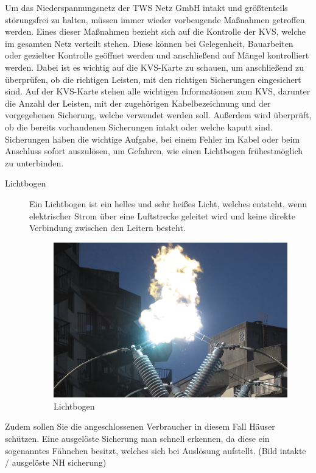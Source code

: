 Um das Niederspannungsnetz der TWS Netz GmbH intakt und größtenteils störungsfrei zu halten, müssen immer wieder vorbeugende Maßnahmen getroffen werden. 
Eines dieser Maßnahmen bezieht sich auf die Kontrolle der KVS, welche im gesamten Netz verteilt stehen. Diese können bei Gelegenheit, Bauarbeiten oder 
gezielter Kontrolle geöffnet werden und anschließend auf Mängel kontrolliert werden. Dabei ist es wichtig auf die KVS-Karte zu schauen, um anschließend 
zu überprüfen, ob die richtigen Leisten, mit den richtigen Sicherungen eingesichert sind. Auf der KVS-Karte stehen alle wichtigen Informationen zum KVS, 
darunter die Anzahl der Leisten, mit der zugehörigen Kabelbezeichnung und der vorgegebenen Sicherung, welche verwendet werden soll.  Außerdem wird überprüft, 
ob die bereits vorhandenen Sicherungen intakt oder welche kaputt sind. Sicherungen haben die wichtige Aufgabe, bei einem Fehler im Kabel oder beim Anschluss 
sofort auszulösen, um Gefahren, wie einen Lichtbogen frühestmöglich zu unterbinden. 
\begin{description}
\item[Lichtbogen] Ein Lichtbogen ist ein helles und sehr heißes Licht, welches entsteht, wenn elektrischer Strom über eine Luftstrecke geleitet wird und 
keine direkte Verbindung zwischen den Leitern besteht.
\begin{figure}[hbt]
\centering
\includegraphics[width=0.87\linewidth]{images/Lichtbogen}
\caption[Lichtbogen]{Lichtbogen \autocite{}}
\label{fig:Lichtbogen}
\end{figure}
\end{description}
Zudem sollen Sie die angeschlossenen Verbraucher in diesem Fall Häuser schützen. Eine ausgelöste Sicherung man schnell erkennen, da diese ein sogenanntes 
Fähnchen besitzt, welches sich bei Auslösung aufstellt. (Bild intakte / ausgelöste NH sicherung) 
